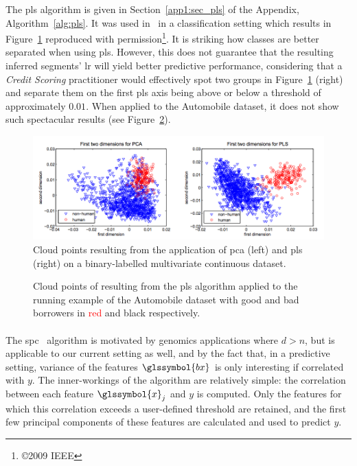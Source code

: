The \gls{pls} algorithm is given in Section~\ref{app1:sec_pls} of the Appendix, Algorithm~\ref{alg:pls}. It was used in~\cite{schwartz2009human} in a classification setting which results in Figure~\ref{fig:pca_vs_pls} reproduced with permission\footnote{\copyright 2009 IEEE}. It is striking how classes are better separated when using \gls{pls}. However, this does not guarantee that the resulting inferred segments' \gls{lr} will yield better predictive performance, considering that a \textit{Credit Scoring} practitioner would effectively spot two groups in Figure~\ref{fig:pca_vs_pls} (right) and separate them on the first \gls{pls} axis being above or below a threshold of approximately $0.01$. When applied to the Automobile dataset, it does not show such spectacular results (see Figure~\ref{fig:simu_pls}).

\begin{figure}
\includegraphics[width = \textwidth]{figures/chapitre6/pca_vs_pls.png}
\caption{Cloud points resulting from the application of \gls{pca} (left) and \gls{pls} (right) on a binary-labelled multivariate continuous dataset.}
\label{fig:pca_vs_pls}
\end{figure}

\begin{figure}
\centering \resizebox{.8\textwidth}{!}{}
\caption{Cloud points of resulting from the \gls{pls} algorithm applied to the running example of the Automobile dataset with good and bad borrowers in \textcolor{red}{red} and black respectively.}
\label{fig:simu_pls}
\end{figure}


\paragraph{}

The \gls{spc}~\cite{bair2006prediction} algorithm is motivated by genomics applications where $d > n$, but is applicable to our current setting as well, and by the fact that, in a predictive setting, variance of the features $\glssymbol{bx}$ is only interesting if correlated with $y$. The inner-workings of the algorithm are relatively simple: the correlation between each feature $\glssymbol{x}_j$ and $y$ is computed. Only the features for which this correlation exceeds a user-defined threshold are retained, and the first few principal components of these features are calculated and used to predict $y$.

